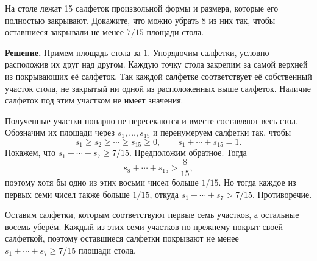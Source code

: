 \begin{problems}
\item На столе лежат 15 салфеток произвольной формы и размера, которые его полностью закрывают. Докажите, что можно убрать 8 из них так, чтобы оставшиеся закрывали не менее $7/15$ площади стола.
\par\smallskip\noindent\textbf{Решение.} Примем площадь стола за $1$. Упорядочим салфетки, условно расположив их друг над другом. Каждую точку стола закрепим за самой верхней из покрывающих её салфеток. Так каждой салфетке соответствует её собственный участок стола, не закрытый ни одной из расположенных выше салфеток. Наличие салфеток под этим участком не имеет значения.
\par Полученные участки попарно не пересекаются и вместе составляют весь стол. Обозначим их площади через $s_1,\ldots,s_{15}$ и перенумеруем салфетки так, чтобы
\[
s_1\ge s_2\ge\cdots\ge s_{15}\ge0,
\qquad s_1+\cdots+s_{15}=1.
\]
Покажем, что $s_1+\cdots+s_7\ge7/15$. Предположим обратное. Тогда
\[
s_8+\cdots+s_{15}>\frac8{15},
\]
поэтому хотя бы одно из этих восьми чисел больше $1/15$. Но тогда каждое из первых семи чисел также больше $1/15$, откуда $s_1+\cdots+s_7>7/15$. Противоречие.
\par Оставим салфетки, которым соответствуют первые семь участков, а остальные восемь уберём. Каждый из этих семи участков по-прежнему покрыт своей салфеткой, поэтому оставшиеся салфетки покрывают не менее $s_1+\cdots+s_7\ge7/15$ площади стола.\par

\end{problems}


